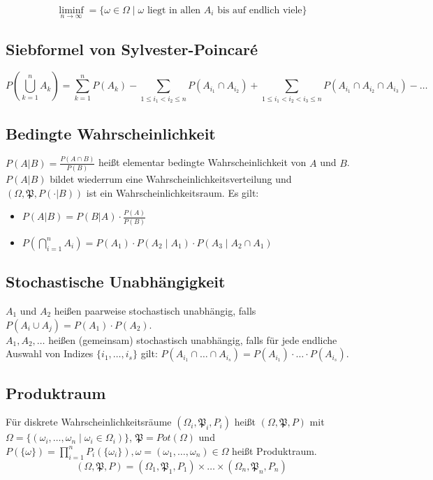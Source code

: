 \documentclass{scrartcl}%
\begin{document}
\[\liminf\limits_{n \rightarrow \infty} = \{\omega \in \Omega \mid \omega \textrm{ liegt in allen } A_i \textrm{ bis auf endlich viele}\}\]

\subsection{Siebformel von Sylvester-Poincaré}
\[P(\bigcup\limits_{k=1}^n A_k) = {\sum\limits_{k=1}^n P(A_k)} - \sum\limits_{1 \leq i_1 < i_2 \leq n} P(A_{i_1} \cap A_{i_2}) + \sum\limits_{1 \leq i_1 < i_2 < i_3 \leq n} P(A_{i_1} \cap A_{i_2} \cap A_{i_3}) - \ldots\]

\subsection{Bedingte Wahrscheinlichkeit}
$P(A\vert B) = \frac{P (A \cap B)}{P(B)}$ heißt elementar bedingte Wahrscheinlichkeit von $A$ und $B$. $P(A\vert B)$ bildet wiederrum eine Wahrscheinlichkeitsverteilung und $(\Omega, \mathfrak{P}, P(\cdot\vert B))$ ist ein Wahrscheinlichkeitsraum. Es gilt:

\begin{itemize}
	\item{$P(A\vert B) = P(B\vert A) \cdot \frac{P(A)}{P(B)}$}
	\item{$P(\bigcap\limits_{i=1}^n A_i) = P(A_1) \cdot P(A_2\mid A_1) \cdot P(A_3\mid A_2 \cap A_1)$}
\end{itemize}

\subsection{Stochastische Unabhängigkeit}
$A_1$ und $A_2$ heißen paarweise stochastisch unabhängig, falls $P(A_i \cup A_j) = P(A_1) \cdot P(A_2)$.\\
$A_1, A_2, \ldots$ heißen (gemeinsam) stochastisch unabhängig, falls für jede endliche Auswahl von Indizes $\{i_1, \ldots, i_s\}$ gilt: $P(A_{i_1} \cap \ldots \cap A_{i_s}) = P(A_{i_1}) \cdot \ldots \cdot P(A_{i_s})$.

\subsection{Produktraum}
Für diskrete Wahrscheinlichkeitsräume $(\Omega_i, \mathfrak{P}_i, P_i)$ heißt $(\Omega, \mathfrak{P}, P)$ mit $\Omega = \{(\omega_i, \ldots, \omega_n \mid \omega_i \in \Omega_i)\}$, $\mathfrak{P} = Pot(\Omega)$ und $P(\{\omega\}) = \prod\limits_{i=1}^n P_i(\{\omega_i\}), \omega = (\omega_1, \ldots,\omega_n) \in \Omega$ heißt Produktraum.
\[(\Omega, \mathfrak{P}, P) = (\Omega_1, \mathfrak{P}_1, P_1) \times \ldots \times (\Omega_n, \mathfrak{P}_n, P_n)\]
\end{document}
